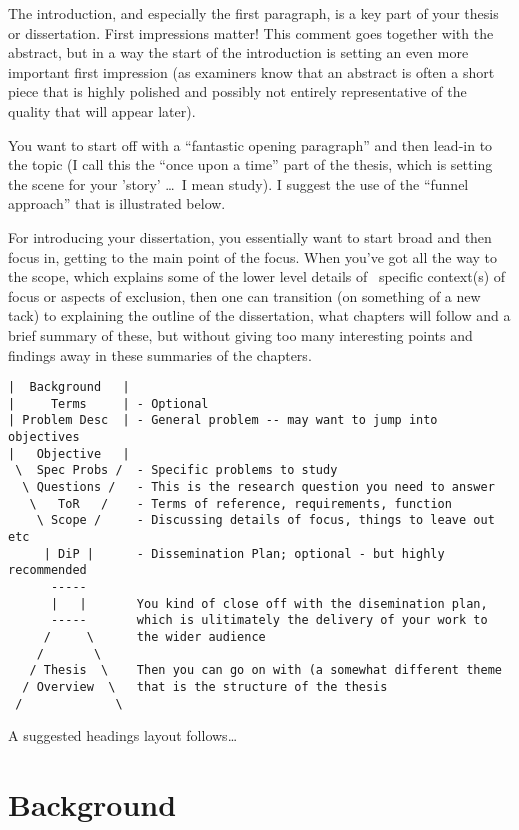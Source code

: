 The introduction, and especially the first paragraph, is a key part of your thesis or dissertation.  First impressions matter!  This comment goes together with the abstract, but in a way the start of the introduction is setting an even more important first impression (as examiners know that an abstract is often a short piece that is highly polished and possibly not entirely representative of the quality that will appear later).

You want to start off with a ``fantastic opening paragraph'' and then lead-in to the topic (I call this the ``once upon a time'' part of the thesis, which is setting the scene for your 'story' \ldots\ I mean study). I suggest the use of the ``funnel approach'' that is illustrated below.

For introducing your dissertation, you essentially want to start broad and then focus in, getting to the main point of the focus.  When you've got all the way to the scope, which explains some of the lower level details of \eg~specific context(s) of focus or aspects of exclusion, then one can transition (on something of a new tack) to explaining the outline of the dissertation, what chapters will follow and a brief summary of these, but without giving too many interesting points and findings away in these summaries of the chapters.

\begin{verbatim}
|  Background   |
|     Terms     | - Optional
| Problem Desc  | - General problem -- may want to jump into objectives
|   Objective   |
 \  Spec Probs /  - Specific problems to study
  \ Questions /   - This is the research question you need to answer
   \   ToR   /    - Terms of reference, requirements, function
    \ Scope /     - Discussing details of focus, things to leave out etc
     | DiP |      - Dissemination Plan; optional - but highly recommended
      -----
      |   |       You kind of close off with the disemination plan,
      -----       which is ulitimately the delivery of your work to
     /     \      the wider audience
    /       \
   / Thesis  \    Then you can go on with (a somewhat different theme
  / Overview  \   that is the structure of the thesis
 /             \
\end{verbatim}

{\color{red} A suggested headings layout follows\ldots}

\section{Background}

